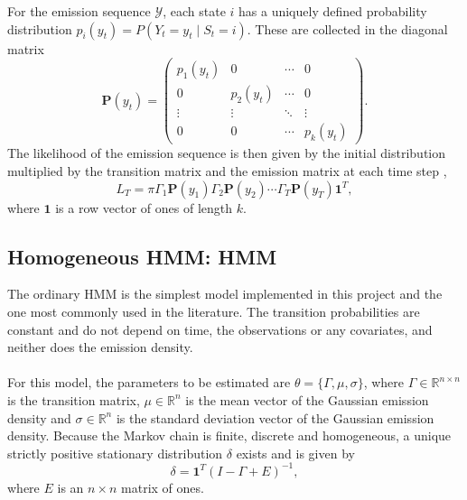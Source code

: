 For the emission sequence $\mathcal{Y}$, each state $i$ has a uniquely defined probability distribution
$p_i(y_t) = P(Y_t = y_t \mid S_t = i)$. These are collected in the diagonal matrix
\begin{equation*}
    \mathbf{P}(y_t) =
    \begin{pmatrix}
        p_1(y_t) & 0        & \cdots & 0        \\
        0        & p_2(y_t) & \cdots & 0        \\
        \vdots   & \vdots   & \ddots & \vdots   \\
        0        & 0        & \cdots & p_k(y_t)
    \end{pmatrix}.
\end{equation*}
The likelihood of the emission sequence is then given by the initial distribution multiplied by
the transition matrix and the emission matrix at each time step \parencite[Sec.~2.3.2]{zucchini2016},
\begin{equation}
    L_T = \pi \Gamma_1 \mathbf{P}(y_1) \Gamma_2 \mathbf{P}(y_2) \cdots \Gamma_T \mathbf{P}(y_T) \mathbf{1}^{T},
    \label{eq:likelihood}
\end{equation}
where $\mathbf{1}$ is a row vector of ones of length $k$.

\subsection{Homogeneous HMM: HMM} \label{sec:hmm-theory}
The ordinary HMM is the simplest model implemented in this project and the one most
commonly used in the literature. The transition probabilities are constant and do not
depend on time, the observations or any covariates, and neither does the emission density.\\
\\
For this model, the parameters to be estimated are $\theta = \{\Gamma, \mu, \sigma\}$, where
$\Gamma \in \mathbb{R}^{n \times n}$ is the transition matrix, $\mu \in \mathbb{R}^{n}$ is the
mean vector of the Gaussian emission density and $\sigma \in \mathbb{R}^{n}$ is the standard
deviation vector of the Gaussian emission density. Because the Markov chain is finite,
discrete and homogeneous, a unique strictly positive stationary distribution $\delta$ exists
\parencite[Sec.~1.3.2]{zucchini2016} and is given by
\begin{equation}
    \delta = \mathbf{1}^{T} \left( I - \Gamma + E \right)^{-1},
    \label{eq:stationary}
\end{equation}
where $E$ is an $n \times n$ matrix of ones.

